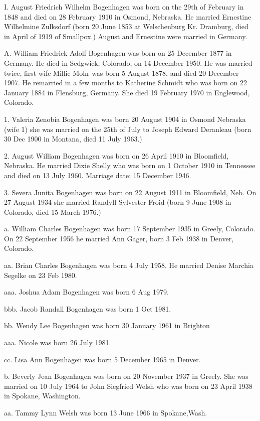 \documentclass[a4paper]{article}
\begin{document}
I. August Friedrich Wilhelm Bogenhagen was born on the 29th of February in 1848 and died on 28 February 1910 in Osmond, Nebraska.  He married Ernestine Wilhelmine Zulksdorf  (born 20 June 1853 at Welschenburg Kr. Dramburg, died in April of 1919 of Smallpox.)  August and Ernestine were married in Germany.  

A. William Friedrick Adolf Bogenhagen was born on 25 December 1877 in Germany. He died in Sedgwick, Colorado, on 14 December 1950.  He was married twice, first wife Millie Mohr was born 5 August 1878, and died 20 December 1907.  He remarried in a few months to  Katherine Schmidt who was born on 22 January 1884 in Flensburg, Germany. She died 19 February 1970 in Englewood, Colorado.
		
1. Valeria Zenobia Bogenhagen was born 20 August 1904 in Osmond Nebraska (wife 1) she was married on the 25th of July to Joseph Edward Deranleau (born 30 Dec 1900 in Montana, died 11 July 1963.)

2. August William Bogenhagen was born on 26 April 1910 in Bloomfield, Nebraska.  He married Dixie Shelly who was born on 1 October 1910 in Tennessee and died on 13 July 1960.  Marriage date: 15 December 1946.

3. Severa Junita Bogenhagen was born on 22 August 1911 in Bloomfield, Neb. On 27 August 1934 she married Randyll Sylvester Froid (born 9 June 1908 in Colorado, died 15 March 1976.)  

a. William Charles Bogenhagen was born 17 September 1935 in Greely, Colorado.  On 22 September 1956 he married Ann Gager, born 3 Feb 1938 in Denver, Colorado.
		
aa. Brian Charles Bogenhagen was born 4 July 1958.  He married Denise Marchia Segelke on 23 Feb 1980.

aaa. Joshua Adam Bogenhagen was born 6 Aug 1979.

bbb. Jacob Randall Bogenhagen was born 1 Oct 1981.

bb. Wendy Lee Bogenhagen was born 30 January 1961 in Brighton
				
aaa. Nicole was born 26 July 1981.

cc. Lisa Ann Bogenhagen was born 5 December 1965 in Denver.

b. Beverly Jean Bogenhagen was born on 20 November 1937 in Greely. She was married on 10 July 1964 to John Siegfried Welsh who was born on 23 April 1938 in Spokane, Washington.
				
aa. Tammy Lynn Welsh was born 13 June 1966 in Spokane,Wash.
\end{document}

